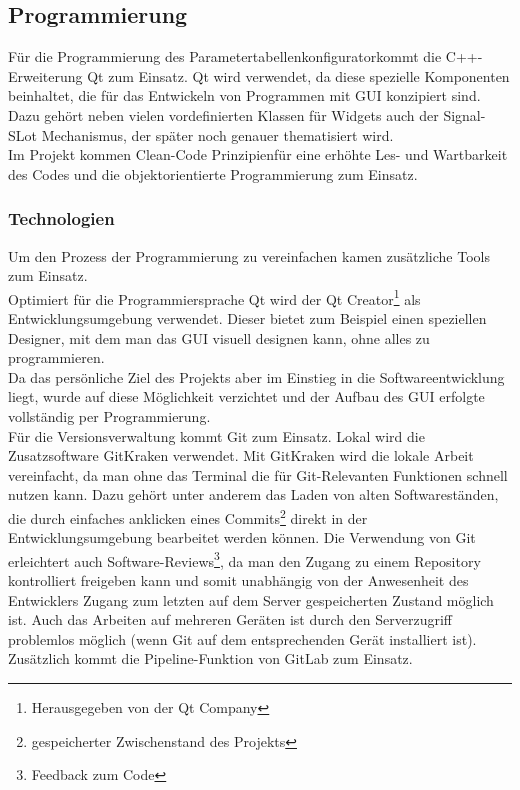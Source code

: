 \documentclass[12pt,a4paper]{article}
\begin{document}
\subsection{Programmierung}
Für die Programmierung des \glqq Parametertabellenkonfigurator\grqq\space kommt die C++-Erweiterung Qt zum Einsatz. Qt wird verwendet, da diese spezielle Komponenten beinhaltet, die für das Entwickeln von Programmen mit GUI %
konzipiert sind. Dazu gehört neben vielen vordefinierten Klassen für Widgets auch der Signal-SLot Mechanismus, der später noch genauer thematisiert wird.\\
Im Projekt kommen \glqq Clean-Code Prinzipien\grqq\space für eine erhöhte Les- und Wartbarkeit des Codes und die objektorientierte Programmierung zum Einsatz.
\subsubsection{Technologien} 
Um den Prozess der Programmierung zu vereinfachen kamen zusätzliche Tools zum Einsatz. \\
Optimiert für die Programmiersprache Qt wird der \glqq Qt Creator\grqq\space\footnote{Herausgegeben von der Qt Company} als Entwicklungsumgebung verwendet. Dieser bietet zum Beispiel einen speziellen Designer, mit dem man das GUI visuell designen kann, ohne alles zu programmieren. \\
Da das persönliche Ziel des Projekts aber im Einstieg in die Softwareentwicklung liegt, wurde auf diese Möglichkeit verzichtet und der Aufbau des GUI erfolgte vollständig per Programmierung. \\
Für die Versionsverwaltung kommt Git zum Einsatz. Lokal wird die Zusatzsoftware GitKraken verwendet. Mit GitKraken wird die lokale Arbeit vereinfacht, da man ohne das Terminal die für Git-Relevanten Funktionen schnell nutzen kann. Dazu gehört unter anderem das Laden von alten Softwareständen, die durch einfaches anklicken eines Commits\footnote{gespeicherter Zwischenstand des Projekts} direkt in der Entwicklungsumgebung bearbeitet werden können. 
Die Verwendung von Git erleichtert auch Software-Reviews\footnote{Feedback zum Code}, da man den Zugang zu einem Repository kontrolliert freigeben kann und somit unabhängig von der Anwesenheit des Entwicklers Zugang zum letzten auf dem Server gespeicherten Zustand möglich ist. Auch das Arbeiten auf mehreren Geräten ist durch den Serverzugriff problemlos möglich (wenn Git auf dem entsprechenden Gerät installiert ist).\\
Zusätzlich kommt die Pipeline-Funktion von GitLab zum Einsatz. \\
\end{document}
